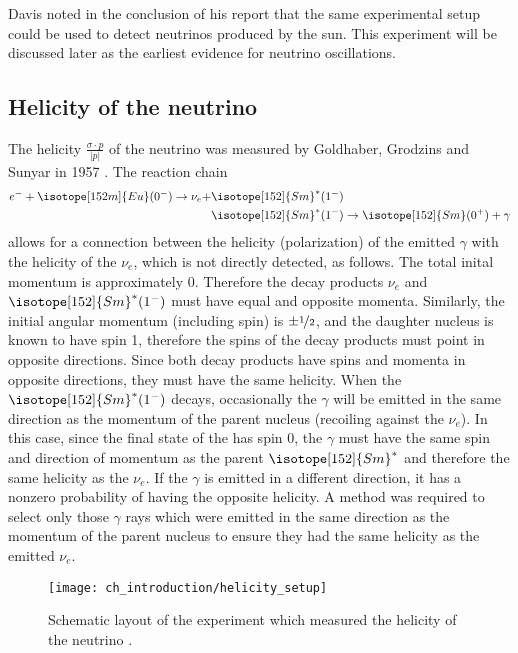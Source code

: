 Davis noted in the conclusion of his report that the same experimental setup
could be used to detect neutrinos produced by the sun.
This experiment will be discussed later as the earliest evidence
for neutrino oscillations.

\subsection{Helicity of the neutrino}
\label{subsec:helicity}

The helicity $\frac{\sigma\cdot p}{\vert p\vert}$ of the neutrino was measured by
Goldhaber, Grodzins and Sunyar in 1957 \cite{helicity_measurement,helicity_review}.
The reaction chain
\begin{align}\label{eq:lampshade}
    \begin{split}
        e^- + \isotope[152m]{Eu}(0^-) \to \nu_e
        + & \isotope[152]{Sm}^*(1^-) \\
          & \isotope[152]{Sm}^*(1^-) \to \isotope[152]{Sm}(0^+) + \gamma
    \end{split}
\end{align}
allows for a connection between the helicity (polarization)
of the emitted $\gamma$
with the helicity of the $\nu_e$, which is not directly detected,
as follows.
The total inital momentum is approximately 0.
Therefore the decay products $\nu_e$ and $\isotope[152]{Sm}^*(1^-)$
must have equal and opposite momenta.
Similarly, the initial angular momentum (including spin) is $\pm\nicefrac{1}{2}$,
and the daughter nucleus is known to have spin 1,
therefore the spins of the decay products must point in opposite directions.
Since both decay products have spins and momenta in opposite directions,
they must have the same helicity.
When the $\isotope[152]{Sm}^*(1^-)$ decays,
occasionally the $\gamma$ will be emitted in the same direction
as the momentum of the parent nucleus (recoiling against the $\nu_e$).
In this case, since the final state of the  has spin 0,
the $\gamma$ must have the same spin and direction of momentum
as the parent $\isotope[152]{Sm}^*$ and therefore the same helicity as the $\nu_e$.
If the $\gamma$ is emitted in a different direction,
it has a nonzero probability of having the opposite helicity.
A method was required to select only those $\gamma$ rays which
were emitted in the same direction as the momentum of the parent nucleus
to ensure they had the same helicity as the emitted $\nu_e$.

\begin{figure}
    \texttt{[image: ch\_introduction/helicity\_setup]}
    \caption{
        Schematic layout of the experiment which measured
        the helicity of the neutrino \cite{helicity_measurement}.
    }
    \label{fig:lampshade}
\end{figure}

